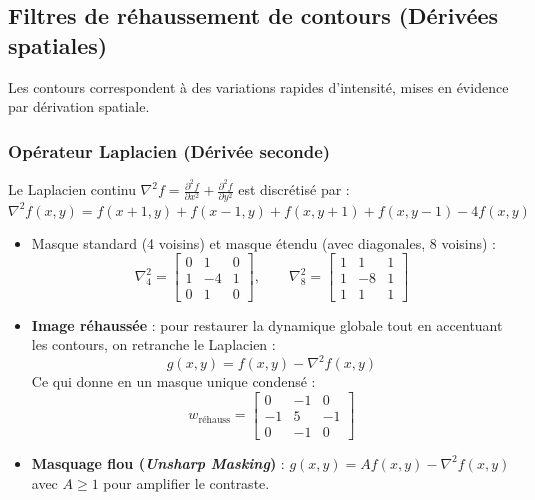 \subsection{Filtres de réhaussement de contours (Dérivées spatiales)}

Les contours correspondent à des variations rapides d'intensité, mises en évidence par dérivation spatiale.

\subsubsection{Opérateur Laplacien (Dérivée seconde)}

Le Laplacien continu $\nabla^2 f = \frac{\partial^2 f}{\partial x^2} + \frac{\partial^2 f}{\partial y^2}$ est discrétisé par :
\begin{equation}
    \nabla^2 f(x,y) = f(x+1, y) + f(x-1, y) + f(x, y+1) + f(x, y-1) - 4 f(x,y)
\end{equation}

\begin{proposition}
    \begin{itemize}
        \item Masque standard (4 voisins) et masque étendu (avec diagonales, 8 voisins) :
            $$
            \nabla^2_{4} = \begin{bmatrix} 0 & 1 & 0 \\ 1 & -4 & 1 \\ 0 & 1 & 0 \end{bmatrix}, \qquad 
            \nabla^2_{8} = \begin{bmatrix} 1 & 1 & 1 \\ 1 & -8 & 1 \\ 1 & 1 & 1 \end{bmatrix}
            $$
        \item \textbf{Image réhaussée} : pour restaurer la dynamique globale tout en accentuant les contours, on retranche le Laplacien :
            \begin{equation}
                g(x,y) = f(x,y) - \nabla^2 f(x,y)
            \end{equation}
            Ce qui donne en un masque unique condensé :
            $$
            w_{\text{réhauss}} = \begin{bmatrix} 0 & -1 & 0 \\ -1 & 5 & -1 \\ 0 & -1 & 0 \end{bmatrix}
            $$
        \item \textbf{Masquage flou (\emph{Unsharp Masking})} : $g(x,y) = A f(x,y) - \nabla^2 f(x,y)$ avec $A \geqslant 1$ pour amplifier le contraste.
    \end{itemize}
\end{proposition}

